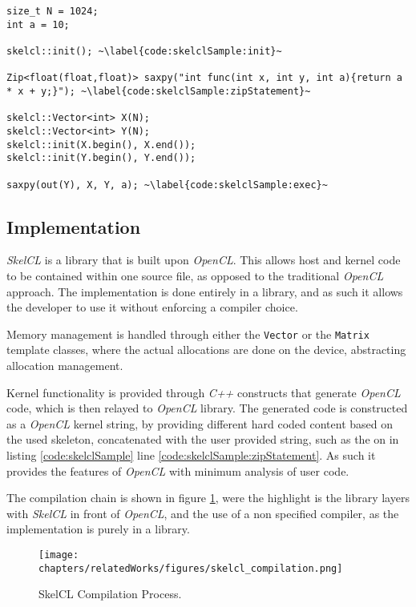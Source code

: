 \begin{lstlisting}[caption={The \textit{SAXPY} computation in \textit{SkelCL}.}, label=code:skelclSample] 
size_t N = 1024;
int a = 10;

skelcl::init(); ~\label{code:skelclSample:init}~

Zip<float(float,float)> saxpy("int func(int x, int y, int a){return a * x + y;}"); ~\label{code:skelclSample:zipStatement}~

skelcl::Vector<int> X(N);      
skelcl::Vector<int> Y(N);
skelcl::init(X.begin(), X.end()); 
skelcl::init(Y.begin(), Y.end());

saxpy(out(Y), X, Y, a); ~\label{code:skelclSample:exec}~
\end{lstlisting}

\subsection{Implementation}
\textit{SkelCL} is a library that is built upon \textit{OpenCL}. This allows host and kernel code to be contained within one source file, as opposed to the traditional \textit{OpenCL} approach.
The implementation is done entirely in a library, and as such it allows the developer to use it without enforcing a compiler choice.

Memory management is handled through either the \texttt{Vector} or the \texttt{Matrix} template classes, where the actual allocations are done on the device, abstracting allocation management.

Kernel functionality is provided through \textit{C++} constructs that generate \textit{OpenCL} code, which is then relayed to \textit{OpenCL} library. The generated code is constructed as a \textit{OpenCL} kernel string, by providing different hard coded content based on the used skeleton, concatenated with the user provided string, such as the on in listing \ref{code:skelclSample} line \ref{code:skelclSample:zipStatement}. As such it provides the features of \textit{OpenCL} with minimum analysis of user code.

The compilation chain is shown in figure \ref{fig:skelclCompilation}, were the highlight is the library layers with \textit{SkelCL} in front of \textit{OpenCL}, and the use of a non specified compiler, as the implementation is purely in a library.
\begin{figure}[H]
\center
\texttt{[image: chapters/relatedWorks/figures/skelcl\_compilation.png]}
\caption{SkelCL Compilation Process.}
\label{fig:skelclCompilation}
\end{figure}

